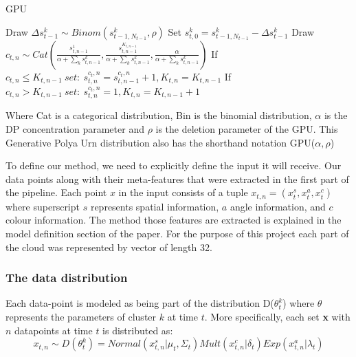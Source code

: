 \documentclass[twoside,hidelinks]{article}
\begin{document}
\begin{algorithm}
  \caption{GPU}\label{GPU}
  \begin{algorithmic}[1]

	      \State Draw $\Delta s_{t-1}^k \sim Binom(s_{t-1,N_{t-1}}^k, \rho) $ 
	      \State Set $s_{t,0}^{k} = s_{t-1,N_{t-1}}^{k} -\Delta s_{t-1}^k$
      \EndFor
      	    \State Draw $c_{t,n} \sim Cat( \frac{ s_{t,n-1}^{1} }{\alpha + \sum_k s_{t,n-1}^{k} }, \frac{ s_{t,n-1}^{K_{t,n-1}} }{\alpha + \sum_k s_{t,n-1}^{k} } , \frac{ \alpha}{\alpha + \sum_k s_{t,n-1}^{k} }) $
      	    \State If $c_{t,n} \leq K_{t,n-1}\ set:\ s_{t,n}^{c_t,n} = s_{t,n-1}^{c_t,n} + 1 , K_{t,n} = K_{t,n-1}$
      	    \State If $c_{t,n} > K_{t,n-1}\ set:\ s_{t,n}^{c_t,n} = 1 , K_{t,n} = K_{t,n-1} + 1$
      \EndFor
    \EndProcedure
  \end{algorithmic}
\end{algorithm}


Where Cat is a categorical distribution, Bin is the binomial distribution, $\alpha$ is the DP concentration parameter and $\rho$ is the deletion parameter of the GPU. This Generative Polya Urn distribution also has the shorthand notation GPU($\alpha,\rho$)

To define our method, we need to explicitly define the input it will receive. Our data points along with their meta-features that were extracted in the first part of the pipeline. Each point $x$ in the input consists of a tuple $x_{t,n} =(x_t^s, x_t^a, x_t^c ) $ where superscript $s$ represents spatial information, $a$ angle information, and $c$ colour information. The method those features are extracted is explained in the model definition section of the paper. For the purpose of this project each part of the cloud was represented by vector of length 32.


\subsubsection{The data distribution}

Each data-point is modeled as being part of the distribution D($\theta_t^k$) where $\theta$ represents the parameters of cluster $k$ at time $t$. More specifically, each set \textbf{x} with $n$ datapoints at time $t$ is distributed as:
$$ x_{t,n} \sim D(\theta_t^k) = Normal(x_{t,n}^s| \mu_t, \Sigma_t) Mult(x_{t,n}^c | \delta_t) Exp(x_{t,n}^a | \lambda_t) $$
\end{document}
